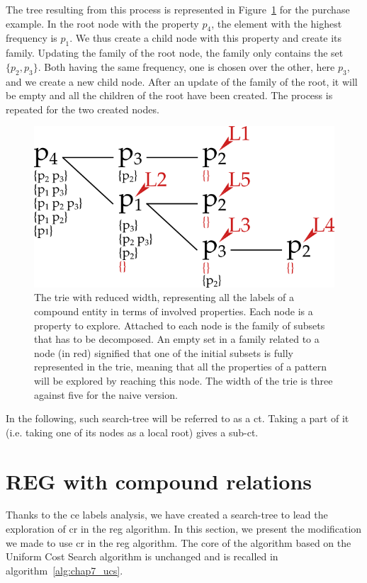 The tree resulting from this process is represented in Figure~\ref{fig:chap7_advanced} for the purchase example. In the root node with the property $p_4$, the element with the highest frequency is $p_1$. We thus create a child node with this property and create its family. Updating the family of the root node, the family only contains the set $\{p_2, p_3\}$. Both having the same frequency, one is chosen over the other, here $p_3$, and we create a new child node. After an update of the family of the root, it will be empty and all the children of the root have been created. The process is repeated for the two created nodes.

\begin{figure}[ht!]
\centering
\includegraphics[scale=0.45]{figures/chapter7/advanced.png}
\caption{\label{fig:chap7_advanced} The trie with reduced width, representing all the labels of a compound entity in terms of involved properties. Each node is a property to explore. Attached to each node is the family of subsets that has to be decomposed. An empty set in a family related to a node (in red) signified that one of the initial subsets is fully represented in the trie, meaning that all the properties of a pattern will be explored by reaching this node. The width of the trie is three against five for the naive version.}
\end{figure}

In the following, such search-tree will be referred to as a \acrfull{ct}. Taking a part of it (i.e. taking one of its nodes as a local root) gives a sub-\acrshort{ct}.

\section{REG with compound relations}

Thanks to the \acrshort{ce} labels analysis, we have created a search-tree to lead the exploration of \acrshort{cr} in the \acrshort{reg} algorithm. In this section, we present the modification we made to use \acrshort{cr} in the \acrshort{reg} algorithm. The core of the algorithm based on the Uniform Cost Search algorithm is unchanged and is recalled in algorithm~\ref{alg:chap7_ucs}.

